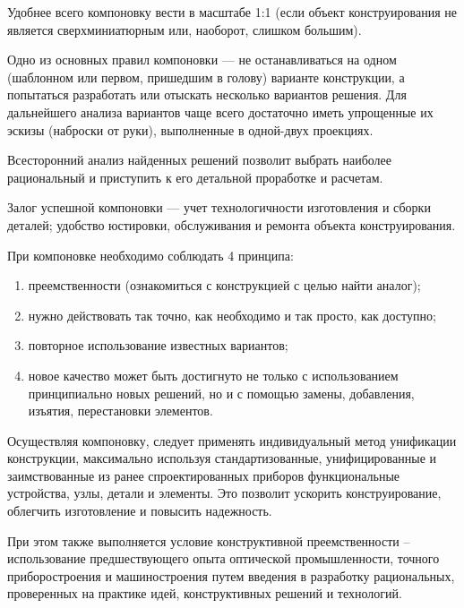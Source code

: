 Удобнее всего компоновку вести в масштабе 1:1 (если объект конструирования не является сверхминиатюрным или, наоборот, слишком большим).

Одно из основных правил компоновки --- не останавливаться на одном (шаблонном или первом, пришедшим в голову) варианте конструкции, а попытаться разработать или отыскать несколько вариантов решения. Для дальнейшего анализа вариантов чаще всего достаточно иметь упрощенные их эскизы (наброски от руки), выполненные в одной-двух проекциях.

Всесторонний анализ найденных решений позволит выбрать наиболее рациональный и приступить к его детальной проработке и расчетам.

Залог успешной компоновки --- учет технологичности изготовления и сборки деталей; удобство юстировки, обслуживания и ремонта объекта конструирования.

При компоновке необходимо соблюдать 4 принципа:
\begin{enumerate}
	\item преемственности (ознакомиться с конструкцией с целью найти аналог);
	\item нужно действовать так точно, как необходимо и так просто, как доступно;
	\item повторное использование известных вариантов;
	\item новое качество может быть достигнуто не только с использованием принципиально новых решений, но и с помощью замены, добавления, изъятия, перестановки элементов. 
\end{enumerate}

Осуществляя компоновку, следует применять индивидуальный метод унификации конструкции, максимально используя стандартизованные, унифицированные и заимствованные из ранее спроектированных приборов функциональные устройства, узлы, детали и элементы. Это позволит ускорить конструирование, облегчить изготовление и повысить надежность. 

При этом также выполняется условие конструктивной преемственности -- использование предшествующего опыта оптической промышленности, точного приборостроения и машиностроения путем введения в разработку рациональных, проверенных на практике идей, конструктивных решений и технологий.

